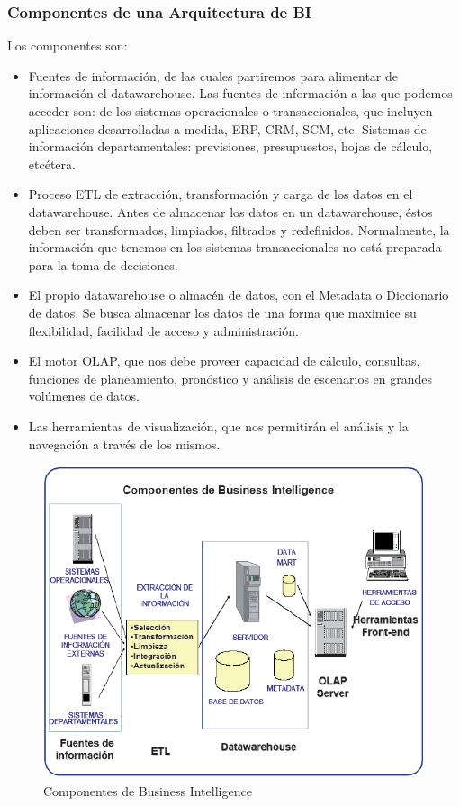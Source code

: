 \documentclass[preprint,12pt]{elsarticle}
\begin{document}
	\subsubsection{\textbf{Componentes de una Arquitectura de BI}}

	Los componentes son:

	\begin{itemize}
	\item Fuentes de información, de las cuales partiremos para alimentar de información el datawarehouse. Las fuentes de información a las que podemos acceder son: de los sistemas operacionales o transaccionales, que incluyen aplicaciones desarrolladas a medida, ERP, CRM, SCM, etc. Sistemas de información departamentales: previsiones, presupuestos, hojas de cálculo, etcétera.
	\item Proceso ETL de extracción, transformación y carga de los datos en el datawarehouse. Antes de almacenar los datos en un datawarehouse, éstos deben ser transformados, limpiados, filtrados y redefinidos. Normalmente, la información que tenemos en los sistemas transaccionales no está preparada para la toma de decisiones.
	\item El propio datawarehouse o almacén de datos, con el Metadata o Diccionario de datos. Se busca almacenar los datos de una forma que maximice su flexibilidad, facilidad de acceso y administración.
	\item El motor OLAP, que nos debe proveer capacidad de cálculo, consultas, funciones de planeamiento, pronóstico y análisis de escenarios en grandes volúmenes de datos.
	\item Las herramientas de visualización, que nos permitirán el análisis y la navegación a través de los mismos.

	\end{itemize}

\begin{figure}[htb]
	\begin{center}
		\includegraphics[width=14cm]{./IMAGENES/componentes} 
		\caption{Componentes de Business Intelligence}
	\end{center}
\end{figure}
\end{document}
